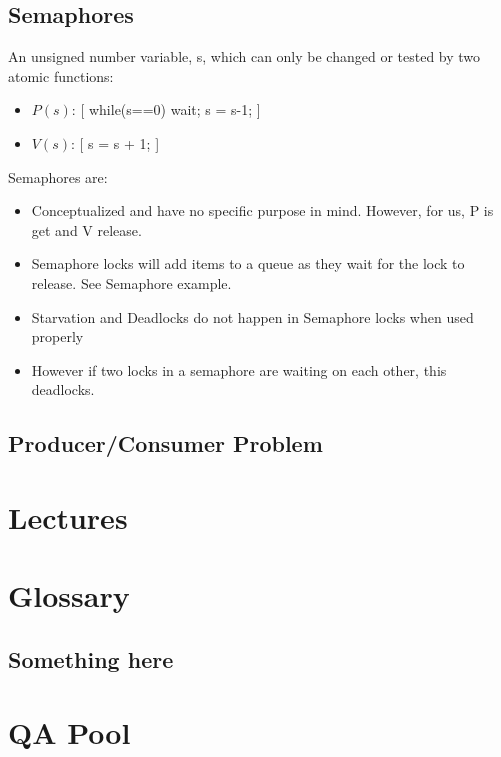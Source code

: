 \documentclass[fontsize=5pt]{scrartcl}
\begin{document}
\begin{multicols}{3}
\begin{itemize}
       \end{itemize}
       \subsection{Semaphores}
         An unsigned number variable, s, which can only be changed or tested by two atomic functions:
         \begin{itemize}
          \item $P(s)$: [ while(s==0) {wait}; s = s-1; ]
          \item $V(s)$: [ s = s + 1; ]
         \end{itemize}
         Semaphores are:
         \begin{itemize}
          \item Conceptualized and have no specific purpose in mind. However, for us, P is get and
                V release.
          \item Semaphore locks will add items to a queue as they wait for the lock to release. See Semaphore example.
          \item Starvation and Deadlocks do not happen in Semaphore locks when used properly
          \item However if two locks in a semaphore are waiting on each other, this deadlocks.
        \end{itemize}
       \subsection{Producer/Consumer Problem}
         


      
  \section{Lectures}
    
      
  \section{Glossary}
    \subsection{Something here}
    
  \section{QA Pool}

\end{multicols}
\end{document}
